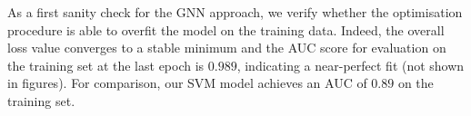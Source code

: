 \documentclass[
	fontsize=10pt, %
	twoside=true, %
	secnumdepth=1, %
  toc=indentunnumbered %
]{kaobook}
\begin{document}



As a first sanity check for the GNN approach, we verify whether the optimisation
procedure is able to overfit the model on the training data. Indeed, the overall
loss value converges to a stable minimum and the AUC score for evaluation on the
training set at the last epoch is $0.989$, indicating a near-perfect fit (not
shown in figures). For comparison, our SVM model achieves an AUC of $0.89$ on the
training set.
\end{document}
